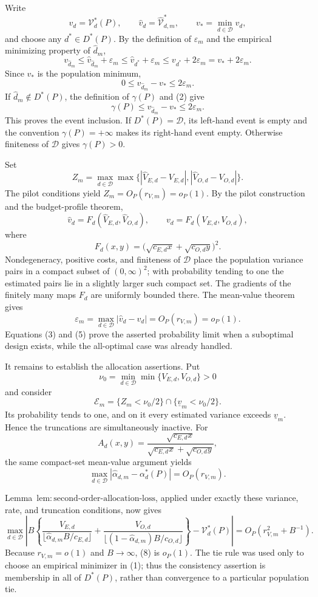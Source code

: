 Write
\[
 v_d=\mathcal V_d^*(P),\qquad
 \widehat v_d=\widehat{\mathcal V}_{d,m}^*,\qquad
 v_* =\min_{d\in\mathcal D}v_d,
\]
and choose any \(d^*\in D^*(P)\).  By the definition of \(\varepsilon_m\) and the empirical minimizing property of \(\widehat d_m\),
\[
 v_{\widehat d_m}
 \le \widehat v_{\widehat d_m}+\varepsilon_m
 \le \widehat v_{d^*}+\varepsilon_m
 \le v_{d^*}+2\varepsilon_m
 =v_*+2\varepsilon_m.
 \tag{1}
\]
Since \(v_*\) is the population minimum,
\[
 0\le v_{\widehat d_m}-v_*\le2\varepsilon_m.
 \tag{2}
\]
If \(\widehat d_m\notin D^*(P)\), the definition of \(\gamma(P)\) and (2) give
\[
 \gamma(P)\le v_{\widehat d_m}-v_*\le2\varepsilon_m.
 \tag{3}
\]
This proves the event inclusion.  If \(D^*(P)=\mathcal D\), its left-hand event is empty and the convention \(\gamma(P)=+\infty\) makes its right-hand event empty.  Otherwise finiteness of \(\mathcal D\) gives \(\gamma(P)>0\).

Set
\[
 Z_m=\max_{d\in\mathcal D}\max\bigl\{
 |\widehat V_{E,d}-V_{E,d}|,
 |\widehat V_{O,d}-V_{O,d}|\bigr\}.
\]
The pilot conditions yield \(Z_m=O_P(r_{V,m})=o_P(1)\).  By the pilot construction and the budget-profile theorem,
\[
 \widehat v_d=F_d(\widehat V_{E,d},\widehat V_{O,d}),
 \qquad
 v_d=F_d(V_{E,d},V_{O,d}),
 \tag{4}
\]
where
\[
 F_d(x,y)=\bigl(\sqrt{c_{E,d}x}+\sqrt{c_{O,d}y}\bigr)^2.
\]
Nondegeneracy, positive costs, and finiteness of \(\mathcal D\) place the population variance pairs in a compact subset of \((0,\infty)^2\); with probability tending to one the estimated pairs lie in a slightly larger such compact set.  The gradients of the finitely many maps \(F_d\) are uniformly bounded there.  The mean-value theorem gives
\[
 \varepsilon_m
 =\max_{d\in\mathcal D}|\widehat v_d-v_d|
 =O_P(r_{V,m})=o_P(1).
 \tag{5}
\]
Equations (3) and (5) prove the asserted probability limit when a suboptimal design exists, while the all-optimal case was already handled.

It remains to establish the allocation assertions.  Put
\[
 \nu_0=\min_{d\in\mathcal D}\min\{V_{E,d},V_{O,d}\}>0
\]
and consider
\[
 \mathcal E_m=\{Z_m<\nu_0/2\}\cap\{\underline v_m<\nu_0/2\}.
 \tag{6}
\]
Its probability tends to one, and on it every estimated variance exceeds \(\underline v_m\).  Hence the truncations are simultaneously inactive.  For
\[
 A_d(x,y)=
 \frac{\sqrt{c_{E,d}x}}
 {\sqrt{c_{E,d}x}+\sqrt{c_{O,d}y}},
\]
the same compact-set mean-value argument yields
\[
 \max_{d\in\mathcal D}
 |\widehat\alpha_{d,m}-\alpha_d^*(P)|=O_P(r_{V,m}).
 \tag{7}
\]

Lemma~\(\mathrm{lem{:}second\text{-}order\text{-}allocation\text{-}loss}\), applied under exactly these variance, rate, and truncation conditions, now gives
\[
\max_{d\in\mathcal D}\left|B\left\{
\frac{V_{E,d}}{\lfloor\widehat\alpha_{d,m}B/c_{E,d}\rfloor}
+\frac{V_{O,d}}{\lfloor(1-\widehat\alpha_{d,m})B/c_{O,d}\rfloor}
\right\}-\mathcal V_d^*(P)\right|
=O_P(r_{V,m}^2+B^{-1}).
 \tag{8}
\]
Because \(r_{V,m}=o(1)\) and \(B\to\infty\), (8) is \(o_P(1)\).  The tie rule was used only to choose an empirical minimizer in (1); thus the consistency assertion is membership in all of \(D^*(P)\), rather than convergence to a particular population tie.